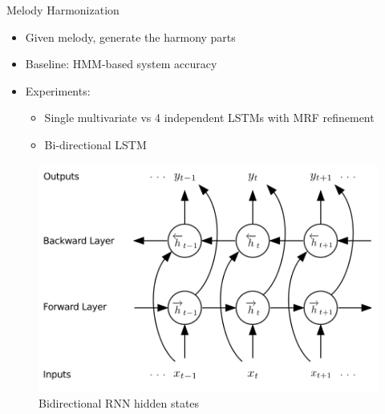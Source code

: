 \documentclass[final]{beamer}
\newlength{\onecolwid}
\newlength{\twocolwid}
\begin{document}
\begin{frame}[t]
\begin{columns}[t]
\begin{column}{\twocolwid}
\begin{columns}[t,totalwidth=\twocolwid]
\begin{column}{\onecolwid}
\begin{block}{Melody Harmonization}

  \begin{itemize}
    \item Given melody, generate the harmony parts
    \item Baseline: HMM-based system\cite{allan2005harmonising} accuracy
    \item Experiments:
      \begin{itemize}
        \item Single multivariate vs 4 independent LSTMs with MRF refinement
        \item Bi-directional LSTM
      \end{itemize}
  \end{itemize}

  \begin{figure}
    \includegraphics[width=0.8\linewidth]{bidir.png}
    \caption{Bidirectional RNN hidden states}
  \end{figure}

\end{block}


\end{column} %

\end{columns} %




\end{column}
\end{columns}
\end{frame}
\end{document}
